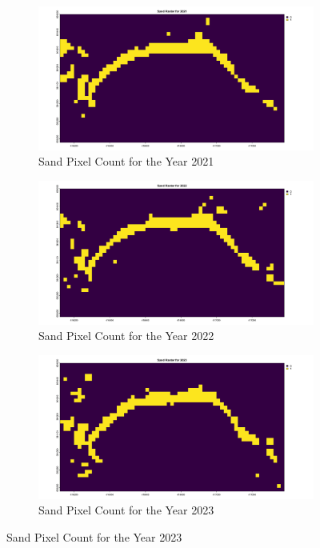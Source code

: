 \documentclass[a4paper,12pt]{article}
\begin{document}
\begin{figure}[H]
    \begin{subfigure}[b]{0.48\linewidth}
        \centering
        \includegraphics[width=\linewidth]{Timeline/Sand_2021.png}
        \caption{Sand Pixel Count for the Year 2021}
        \label{fig:Sand_2021}
    \end{subfigure}
    \hspace{0.02\linewidth}
    \begin{subfigure}[b]{0.48\linewidth}
        \centering
        \includegraphics[width=\linewidth]{Timeline/Sand_2022.png}
        \caption{Sand Pixel Count for the Year 2022}
        \label{fig:Sand_2022}
    \end{subfigure}

    \vspace{1em} %

    \begin{subfigure}[b]{0.48\linewidth}
        \centering
        \includegraphics[width=\linewidth]{Timeline/Sand_2023.png}
        \caption{Sand Pixel Count for the Year 2023}
        \label{fig:Sand_2023}
    \end{subfigure}


\end{figure}
\end{document}
